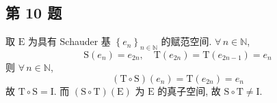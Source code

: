 \documentclass[\ROOT/main.tex]{subfiles}
\begin{document}
\subsection{第 10 题}
取 $\mathrm{E}$ 为具有 Schauder 基 $\left\{ e_n \right\}_{n \in \mathbb{N}}$ 的赋范空间.
$\forall \, n \in \mathbb{N}$,
\[
    \mathrm{S} \left( e_n \right) = e_{2n}
    , \quad
    \mathrm{T} \left( e_{2n} \right) = \mathrm{T} \left( e_{2n - 1} \right) = e_n
\]
则 $\forall \, n \in \mathbb{N}$,
\[
    \left( \mathrm{T} \circ \mathrm{S} \right) \left( e_n \right) = \mathrm{T} \left( e_{2 n} \right) = e_n
\]
故 $\mathrm{T} \circ \mathrm{S} = \mathrm{I}$.
而 $\left( \mathrm{S} \circ \mathrm{T} \right) \left( \mathrm{E} \right)$ 为 $\mathrm{E}$ 的真子空间, 故 $\mathrm{S} \circ \mathrm{T} \neq \mathrm{I}$.
\end{document}
